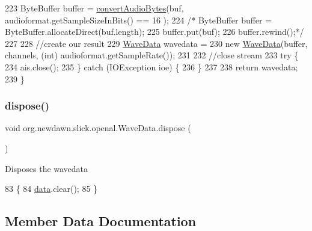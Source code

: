 \begin{DoxyCode}
223         ByteBuffer buffer = \mbox{\hyperlink{classorg_1_1newdawn_1_1slick_1_1openal_1_1_wave_data_aeabccb3f7c90a03c8bde39237f32df34}{convertAudioBytes}}(buf, audioformat.getSampleSizeInBits() == 16
      );
224 \textcolor{comment}{/*      ByteBuffer buffer = ByteBuffer.allocateDirect(buf.length);}
225 \textcolor{comment}{        buffer.put(buf);}
226 \textcolor{comment}{        buffer.rewind();*/}
227 
228         \textcolor{comment}{//create our result}
229         \mbox{\hyperlink{classorg_1_1newdawn_1_1slick_1_1openal_1_1_wave_data_a81d45aa86be7b24411e50b4b7b6bed0d}{WaveData}} wavedata =
230             \textcolor{keyword}{new} \mbox{\hyperlink{classorg_1_1newdawn_1_1slick_1_1openal_1_1_wave_data_a81d45aa86be7b24411e50b4b7b6bed0d}{WaveData}}(buffer, channels, (\textcolor{keywordtype}{int}) audioformat.getSampleRate());
231 
232         \textcolor{comment}{//close stream}
233         \textcolor{keywordflow}{try} \{
234             ais.close();
235         \} \textcolor{keywordflow}{catch} (IOException ioe) \{
236         \}
237 
238         \textcolor{keywordflow}{return} wavedata;
239     \}
\end{DoxyCode}
\mbox{\label{classorg_1_1newdawn_1_1slick_1_1openal_1_1_wave_data_a3dad03d37eeed32c00139e8e500eead5}} 
\subsubsection{\texorpdfstring{dispose()}{dispose()}}
{\footnotesize\ttfamily void org.\+newdawn.\+slick.\+openal.\+Wave\+Data.\+dispose (\begin{DoxyParamCaption}{ }\end{DoxyParamCaption})\hspace{0.3cm}{\ttfamily [inline]}}

Disposes the wavedata 
\begin{DoxyCode}
83                           \{
84         \mbox{\hyperlink{classorg_1_1newdawn_1_1slick_1_1openal_1_1_wave_data_af9383885dad52bb0a58a05b3d6c3fb9a}{data}}.clear();
85     \}
\end{DoxyCode}


\subsection{Member Data Documentation}
\mbox{\label{classorg_1_1newdawn_1_1slick_1_1openal_1_1_wave_data_af9383885dad52bb0a58a05b3d6c3fb9a}} 
